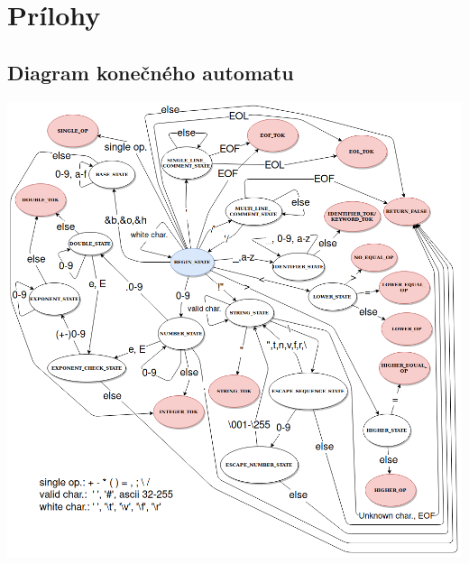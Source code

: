 \documentclass{article}
\begin{document}
    \newpage
    \section{Prílohy}
        \subsection{Diagram konečného automatu}
            \includegraphics[trim=6cm 0 0 0, width=15cm]{finite_automata.png}
            \newpage
            
\end{document}
